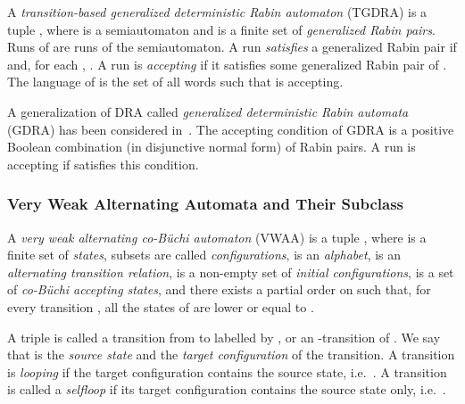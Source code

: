 \documentclass{llncs}
\begin{document}
A \emph{transition-based generalized deterministic Rabin automaton} (TGDRA)
is a tuple , where
 is a semiautomaton and  is a finite set of \emph{generalized Rabin
  pairs}.  
Runs of  are runs of the semiautomaton.  A run 
\emph{satisfies} a generalized Rabin pair  if  and, for each
, .  A run is \emph{accepting}
if it satisfies some generalized Rabin pair of .  The language
of  is the set  of all words  such that
 is accepting.

A generalization of DRA called \emph{generalized deterministic Rabin
  automata} (GDRA) has been considered in~\cite{KE12,GKE12}. The accepting
condition of GDRA is a positive Boolean combination (in disjunctive normal
form) of Rabin pairs. A run  is accepting if  satisfies this
condition.








\subsubsection{Very Weak Alternating Automata and Their Subclass}
\label{def:MMAA}

A \emph{very weak alternating co-B\"{u}chi automaton} (VWAA) 
is a tuple , where  is a finite set of
\emph{states}, subsets  are called \emph{configurations},
 is an \emph{alphabet},  is an \emph{alternating transition relation},  is a
non-empty set of \emph{initial configurations},  is a set of
\emph{co-B\"{u}chi accepting states}, and there exists a partial order on
 such that, for every transition , all the states
of  are lower or equal to .

A triple  is called a transition from  to 
labelled by , or an -transition of .  We say that  is
the \emph{source state} and  the \emph{target configuration} of the
transition.  A transition is \emph{looping} if the target configuration
contains the source state, i.e.~.  A transition is called a
\emph{selfloop} if its target configuration contains the source state only,
i.e.~.
\end{document}
